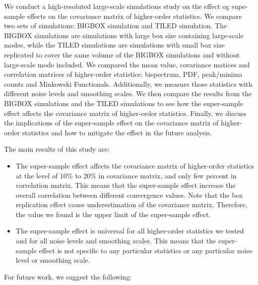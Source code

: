 We conduct a high-resoluted large-scale simulations study on the effect og supe-sample effects on the covariance matrix of higher-order statistics. We compare two sets of simulations: BIGBOX simulation and TILED simulation. The BIGBOX simulations are simulations with large box size containing large-scale modes, while the TILED simulations are simulations with small box size replicated to cover the same volume of the BIGBOX simulations and without large-scale mode included. We compared the mean value, covariance matices and correlation matrices of higher-order statistics: bispectrum, PDF, peak/minima counts and Minkowski Functionals. Additionally, we measure those statistics with different noise levels and smoothing scales. We then compare the results from the BIGBOX simulations and the TILED simulations to see how the super-sample effect affects the covariance matrix of higher-order statistics. Finally, we discuss the implications of the super-sample effect on the covariance matrix of higher-order statistics and how to mitigate the effect in the future analysis.

The main results of this study are:
\begin{itemize}
    \item The super-sample effect affects the covariance matrix of higher-order statistics at the level of 10\% to 20\% in covariance matrix, and only few percent in correlation matrix. This means that the super-sample effect increase the overall correlation between different convergence values. Note that the box replication effect cause underestimation of the covariance matrix. Therefore, the value we found is the upper limit of the super-sample effect.
    \item The super-sample effect is universal for all higher-order statistics we tested and for all noise levels and smoothing scales. This means that the super-sample effect is not specific to any particular statistics or any particular noise level or smoothing scale. 
\end{itemize}

For future work, we suggest the following: